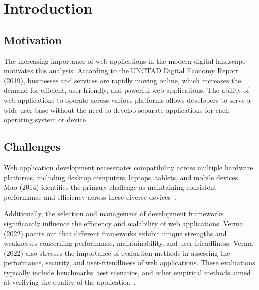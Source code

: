 \documentclass[conference]{IEEEtran}
\begin{document}
\section{Introduction}
\label{cha:Introduction}


\subsection{Motivation}
The increasing importance of web applications in the modern digital landscape motivates this analysis. According to the UNCTAD Digital Economy Report (2019), businesses and services are rapidly moving online, which increases the demand for efficient, user-friendly, and powerful web applications. The ability of web applications to operate across various platforms allows developers to serve a wide user base without the need to develop separate applications for each operating system or device~\cite{unctad}.
\newline
\subsection{Challenges}

Web application development necessitates compatibility across multiple hardware platforms, including desktop computers, laptops, tablets, and mobile devices. Mao (2014) identifies the primary challenge as maintaining consistent performance and efficiency across these diverse devices~\cite{mao2014developing}.

Additionally, the selection and management of development frameworks significantly influence the efficiency and scalability of web applications. Verma (2022) points out that different frameworks exhibit unique strengths and weaknesses concerning performance, maintainability, and user-friendliness. Verma (2022) also stresses the importance of evaluation methods in assessing the performance, security, and user-friendliness of web applications. These evaluations typically include benchmarks, test scenarios, and other empirical methods aimed at verifying the quality of the application~\cite{verma2022comparison}.
\newline
\end{document}
